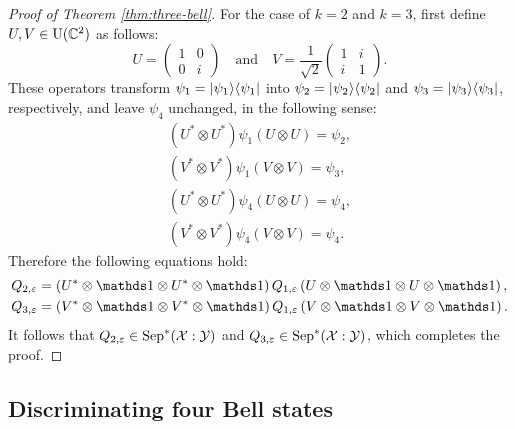 \begin{proof}[Proof of Theorem \ref{thm:three-bell}]
  For the case of $k=2$ and $k = 3$, first define 
  $U, V \in \mathrm{U}(\mathbb{C}^{2})$ as follows:
  \begin{equation}
    U = \begin{pmatrix}
      1 & 0\\
      0 & i
    \end{pmatrix}
    \quad \mbox{and} \quad
    V = \frac{1}{\sqrt{2}}\begin{pmatrix}
      1 & i\\
      i & 1
    \end{pmatrix}.
  \end{equation}
  These operators transform $\psi_{1} = \lvert\mspace{0.5mu} \psi_1 \mspace{0.5mu} \rangle\langle\mspace{0.5mu} \psi_1 \mspace{0.5mu} \rvert$ into 
  $\psi_{2} = \lvert\mspace{0.5mu} \psi_2 \mspace{0.5mu} \rangle\langle\mspace{0.5mu} \psi_2 \mspace{0.5mu} \rvert$ and $\psi_{3} =
  \lvert\mspace{0.5mu} \psi_3 \mspace{0.5mu} \rangle\langle\mspace{0.5mu} \psi_3 \mspace{0.5mu} \rvert$, respectively, and leave $\psi_{4}$ unchanged, in
  the following sense:
  \begin{equation}
    \begin{aligned}
      (U^{\ast}\otimes U^{\ast}) \psi_{1} (U\otimes U) = \psi_{2},\\
      (V^{\ast}\otimes V^{\ast}) \psi_{1} (V\otimes V) = \psi_{3},\\
      (U^{\ast}\otimes U^{\ast}) \psi_{4} (U\otimes U) = \psi_{4},\\
      (V^{\ast}\otimes V^{\ast}) \psi_{4} (V\otimes V) = \psi_{4}.
    \end{aligned}
  \end{equation}
  Therefore the following equations hold:
  \begin{equation}
    \begin{aligned}
      Q_{2,\eps} &= \left(U^{\ast}\otimes\I \otimes U^{\ast}\otimes\I\right) 
      Q_{1,\eps} \left(U\otimes\I \otimes U\otimes\I\right),  \\
      Q_{3,\eps} &= \left(V^{\ast}\otimes\I \otimes V^{\ast}\otimes\I\right) 
      Q_{1,\eps} \left(V\otimes\I \otimes V\otimes\I\right).
    \end{aligned}
  \end{equation}
  It follows that $Q_{2,\varepsilon}\in\mathrm{Sep}^{\ast}(\mathcal{X}:\mathcal{Y})$ and $Q_{3,\varepsilon}\in\mathrm{Sep}^{\ast}(\mathcal{X}:\mathcal{Y})$,
  which completes the proof.
\end{proof}

\subsection{Discriminating four Bell states}

